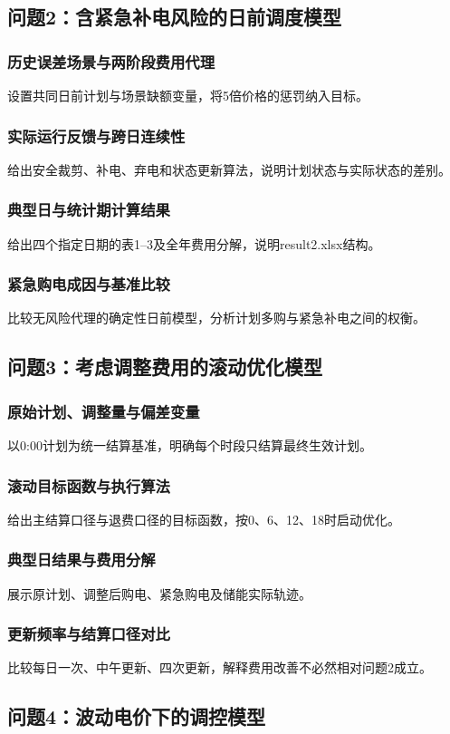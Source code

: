 \documentclass[UTF8,a4paper,zihao=-4]{ctexart}
\begin{document}
\subsection{问题2：含紧急补电风险的日前调度模型}
\subsubsection{历史误差场景与两阶段费用代理}设置共同日前计划与场景缺额变量，将5倍价格的惩罚纳入目标。
\subsubsection{实际运行反馈与跨日连续性}给出安全裁剪、补电、弃电和状态更新算法，说明计划状态与实际状态的差别。
\subsubsection{典型日与统计期计算结果}给出四个指定日期的表1--3及全年费用分解，说明result2.xlsx结构。
\subsubsection{紧急购电成因与基准比较}比较无风险代理的确定性日前模型，分析计划多购与紧急补电之间的权衡。
\subsection{问题3：考虑调整费用的滚动优化模型}
\subsubsection{原始计划、调整量与偏差变量}以0:00计划为统一结算基准，明确每个时段只结算最终生效计划。
\subsubsection{滚动目标函数与执行算法}给出主结算口径与退费口径的目标函数，按0、6、12、18时启动优化。
\subsubsection{典型日结果与费用分解}展示原计划、调整后购电、紧急购电及储能实际轨迹。
\subsubsection{更新频率与结算口径对比}比较每日一次、中午更新、四次更新，解释费用改善不必然相对问题2成立。
\subsection{问题4：波动电价下的调控模型}
\end{document}

